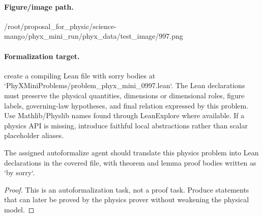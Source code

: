 \paragraph{Figure/image path.}
/root/proposal\_for\_physic/science-mango/phyx\_mini\_run/phyx\_data/test\_image/997.png

\paragraph{Formalization target.}
create a compiling Lean file with sorry bodies at `PhyXMiniProblems/problem\_phyx\_mini\_0997.lean`. The Lean declarations must preserve the physical quantities, dimensions or dimensional roles, figure labels, governing-law hypotheses, and final relation expressed by this problem.
Use Mathlib/Physlib names found through LeanExplore where available. If a physics API is missing, introduce faithful local abstractions rather than scalar placeholder aliases.

\begin{theorem}
\label{thm:physics:phyx_mini_0997:target}
The assigned autoformalize agent should translate this physics problem into Lean declarations in the covered file, with theorem and lemma proof bodies written as `by sorry`.
\end{theorem}
\begin{proof}
This is an autoformalization task, not a proof task. Produce statements that can later be proved by the physics prover without weakening the physical model.
\end{proof}

